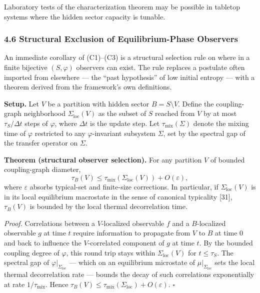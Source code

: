 \documentclass[
]{article}
\begin{document}
Laboratory tests of the characterization theorem may be possible in
tabletop systems where the hidden sector capacity is tunable.

\hypertarget{structural-exclusion-of-equilibrium-phase-observers}{%
\subsubsection{4.6 Structural Exclusion of Equilibrium-Phase
Observers}\label{structural-exclusion-of-equilibrium-phase-observers}}

An immediate corollary of (C1)--(C3) is a structural selection rule on
where in a finite bijective \((S, \varphi)\) observers can exist. The
rule replaces a postulate often imported from elsewhere --- the ``past
hypothesis'' of low initial entropy --- with a theorem derived from the
framework's own definitions.

\textbf{Setup.} Let \(V\) be a partition with hidden sector
\(B = S \setminus V\). Define the coupling-graph neighborhood
\(\Sigma_{\text{loc}}(V)\) as the subset of \(S\) reached from \(V\) by
at most \(\tau_S / \Delta t\) steps of \(\varphi\), where \(\Delta t\)
is the update step. Let \(\tau_{\text{mix}}(\Sigma)\) denote the mixing
time of \(\varphi\) restricted to any \(\varphi\)-invariant subsystem
\(\Sigma\), set by the spectral gap of the transfer operator on
\(\Sigma\).

\textbf{Theorem (structural observer selection).} For any partition
\(V\) of bounded coupling-graph diameter, \[
\tau_B(V) \leq \tau_{\text{mix}}(\Sigma_{\text{loc}}(V)) + O(\varepsilon),
\] where \(\varepsilon\) absorbs typical-set and finite-size
corrections. In particular, if \(\Sigma_{\text{loc}}(V)\) is in its
local equilibrium macrostate in the sense of canonical typicality
{[}31{]}, \(\tau_B(V)\) is bounded by the local thermal decorrelation
time.

\emph{Proof.} Correlations between a \(V\)-localized observable \(f\)
and a \(B\)-localized observable \(g\) at time \(t\) require information
to propagate from \(V\) to \(B\) at time \(0\) and back to influence the
\(V\)-correlated component of \(g\) at time \(t\). By the bounded
coupling degree of \(\varphi\), this round trip stays within
\(\Sigma_{\text{loc}}(V)\) for \(t \leq \tau_S\). The spectral gap of
\(\varphi|_{\Sigma_{\text{loc}}}\) --- which on an equilibrium
microstate of \(\mu|_{\Sigma_{\text{loc}}}\) sets the local thermal
decorrelation rate --- bounds the decay of such correlations
exponentially at rate \(1/\tau_{\text{mix}}\). Hence
\(\tau_B(V) \leq \tau_{\text{mix}}(\Sigma_{\text{loc}}) + O(\varepsilon)\).
\(\square\)
\end{document}
